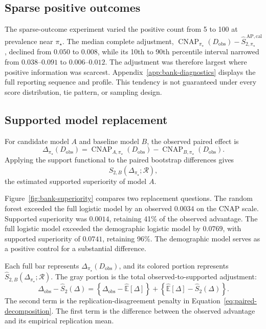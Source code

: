 \documentclass[11pt]{article}
\newcommand{\CNAP}{\operatorname{CNAP}}
\newcommand{\Regime}{\mathcal{R}}
\newcommand{\Tpi}{\CNAP_{\pi_\star}}
\newcommand{\E}{\mathbb{E}}
\newcommand{\SAPcalHat}{\widehat S_{2,\pi_\star}^{\,\mathrm{AP,cal}}}
\theoremstyle{remark}
\begin{document}
\subsection{Sparse positive outcomes}

The sparse-outcome experiment varied the positive count from 5 to 100 at prevalence near $\pi_\star$. The median complete adjustment, $\Tpi(D_{\mathrm{obs}})-\SAPcalHat$, declined from $0.050$ to $0.008$, while its 10th to 90th percentile interval narrowed from $0.038$--$0.091$ to $0.006$--$0.012$. The adjustment was therefore largest where positive information was scarcest. Appendix~\ref{app:bank-diagnostics} displays the full reporting sequence and profile. This tendency is not guaranteed under every score distribution, tie pattern, or sampling design.

\subsection{Supported model replacement}

For candidate model $A$ and baseline model $B$, the observed paired effect is
\[
\Delta_{\pi_\star}(D_{\mathrm{obs}})
=
\CNAP_{A,\pi_\star}(D_{\mathrm{obs}})
-
\CNAP_{B,\pi_\star}(D_{\mathrm{obs}}).
\]
Applying the support functional to the paired bootstrap differences gives
\[
\widehat S_{2,B}
(\Delta_{\pi_\star};\Regime),
\]
the estimated supported superiority of model $A$.

Figure~\ref{fig:bank-superiority} compares two replacement questions. The random forest exceeded the full logistic model by an observed $0.0034$ on the CNAP scale. Supported superiority was $0.0014$, retaining 41\% of the observed advantage. The full logistic model exceeded the demographic logistic model by $0.0769$, with supported superiority of $0.0741$, retaining 96\%. The demographic model serves as a positive control for a substantial difference.

Each full bar represents $\Delta_{\pi_\star}(D_{\mathrm{obs}})$, and its colored portion represents $\widehat S_{2,B}(\Delta_{\pi_\star};\Regime)$. The gray portion is the total observed-to-supported adjustment:
\[
\Delta_{\mathrm{obs}}-\widehat S_2(\Delta)
=
\left\{
\Delta_{\mathrm{obs}}-\widehat{\E}[\Delta]
\right\}
+
\left\{
\widehat{\E}[\Delta]-\widehat S_2(\Delta)
\right\}.
\]
The second term is the replication-disagreement penalty in Equation~\eqref{eq:paired-decomposition}. The first term is the difference between the observed advantage and its empirical replication mean.
\end{document}
